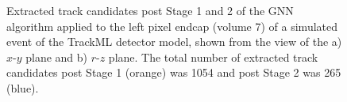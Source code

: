 \begin{figure}[htbp]%
    \centering
    \hfill
    \caption{Extracted track candidates post Stage 1 and 2 of the GNN algorithm applied to the left pixel endcap (volume 7) of a simulated event of the TrackML detector model, shown from the view of the a) $x$-$y$ plane and b) $r$-$z$ plane. The total number of extracted track candidates post Stage 1 (orange) was 1054 and post Stage 2 was 265 (blue).}%
    \label{fig:trackml-results-endcap-extracted-v2}%
\end{figure}

